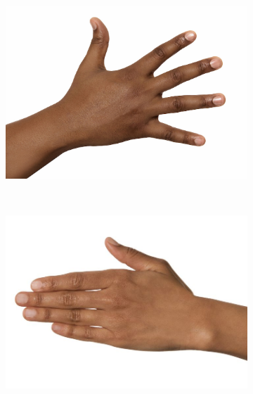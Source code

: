 \documentclass[12pt, a4paper]{article}
\begin{document}
\begin{figure}[H]
    \centering
    \begin{subfigure}[b]{0.20\textwidth}
        \includegraphics[width=\textwidth]{images/hand_dark}
        \caption{}\label{img:input_hands_1_dark}
    \end{subfigure}
    ~
    \begin{subfigure}[b]{0.20\textwidth}
        \includegraphics[width=\textwidth]{images/hand_brown}
        \caption{}\label{img:input_hands_1_brown}
    \end{subfigure}
    ~
    \begin{subfigure}[b]{0.20\textwidth}

\end{subfigure}
\end{figure}
\end{document}
